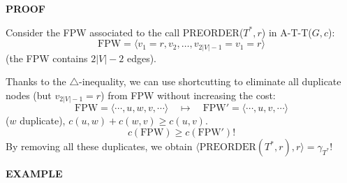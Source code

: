 \textbf{PROOF}

Consider the FPW associated to the call PREORDER($T^*,r$) in A-T-T($G,c$):
\[\mathrm{FPW}=\langle v_1=r,v_2,\ldots,v_{2|V|-1}=v_1=r\rangle\]
(the FPW contains $2|V|-2$ edges).

Thanks to the $\triangle$-inequality, we can use shortcutting to eliminate all duplicate nodes (but $v_{2|V|-1}=r$) from FPW without increasing the cost:
\[\mathrm{FPW}=\langle\cdots,u,w,v,\cdots\rangle
\quad\longmapsto\quad\mathrm{FPW}'=\langle\cdots,u,v,\cdots\rangle\]
($w$ duplicate), $c(u,w)+c(w,v)\geq c(u,v)$.
\[c(\mathrm{FPW})\geq c(\mathrm{FPW}')!\]
By removing all these duplicates, we obtain $\langle\mathrm{PREORDER}(T^*,r),r\rangle=\gamma_{T^*}$!

\textbf{EXAMPLE}
